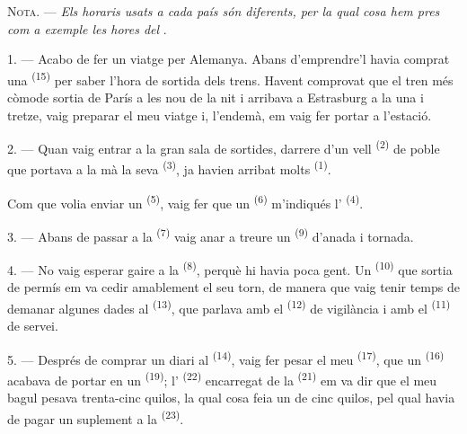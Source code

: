 
\VUsaut{4.0mm}
\VUsaut{2.4mm}
\VUsaut{3.4mm}
\textsc{Nota.} --- \textit{Els horaris usats a cada país són diferents, per la qual
cosa hem pres com a exemple les hores del} .

1. --- Acabo de fer un viatge per Alemanya. Abans d'emprendre'l havia comprat una
 \textsuperscript{(15)} per saber l'hora de sortida dels
trens. Havent comprovat que el tren més còmode sortia de París a les nou de la
nit i arribava a Estrasburg a la una i tretze, vaig preparar el meu viatge i,
l'endemà, em vaig fer portar a l'estació.

2. --- Quan vaig entrar a la gran sala de sortides, darrere d'un vell
 \textsuperscript{(2)} de poble que portava a la mà la seva
 \textsuperscript{(3)}, ja havien arribat molts
 \textsuperscript{(1)}.

Com que volia enviar un  \textsuperscript{(5)}, vaig fer que un
 \textsuperscript{(6)} m'indiqués l'
\textsuperscript{(4)}.

3. --- Abans de passar a la  \textsuperscript{(7)} vaig anar a
treure un  \textsuperscript{(9)} d'anada i tornada.

4. --- No vaig esperar gaire a la  \textsuperscript{(8)}, perquè hi
havia poca gent. Un  \textsuperscript{(10)} que sortia de permís em
va cedir amablement el seu torn, de manera que vaig tenir temps de demanar
algunes dades al  \textsuperscript{(13)}, que parlava amb el
 \textsuperscript{(12)} de vigilància i amb el
 \textsuperscript{(11)} de servei.

\VUsaut{3.0mm}

5. --- Després de comprar un diari al 
\textsuperscript{(14)}, vaig fer pesar el meu 
\textsuperscript{(17)}, que un  \textsuperscript{(16)} acabava de
portar en un  \textsuperscript{(19)}; l'
\textsuperscript{(22)} encarregat de la  \textsuperscript{(21)} em
va dir que el meu bagul pesava trenta-cinc quilos, la qual cosa feia un
 de cinc quilos, pel qual havia de pagar un suplement a la
 \textsuperscript{(23)}.

